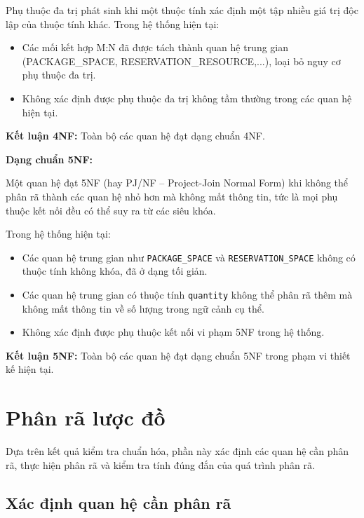 Phụ thuộc đa trị phát sinh khi một thuộc tính xác định một tập nhiều giá trị độc lập của thuộc tính khác. Trong hệ thống hiện tại:

\begin{itemize}
    \item Các mối kết hợp M:N đã được tách thành quan hệ trung gian (PACKAGE\_SPACE, RESERVATION\_RESOURCE,...), loại bỏ nguy cơ phụ thuộc đa trị.
    \item Không xác định được phụ thuộc đa trị không tầm thường trong các quan hệ hiện tại.
\end{itemize}

\textbf{Kết luận 4NF:} Toàn bộ các quan hệ đạt dạng chuẩn 4NF.

\textbf{Dạng chuẩn 5NF:}

Một quan hệ đạt 5NF (hay PJ/NF -- Project-Join Normal Form) khi không thể phân rã thành các quan hệ nhỏ hơn mà không mất thông tin, tức là mọi phụ thuộc kết nối đều có thể suy ra từ các siêu khóa.

Trong hệ thống hiện tại:

\begin{itemize}
    \item Các quan hệ trung gian như \texttt{PACKAGE\_SPACE} và \texttt{RESERVATION\_SPACE} không có thuộc tính không khóa, đã ở dạng tối giản.
    \item Các quan hệ trung gian có thuộc tính \texttt{quantity} không thể phân rã thêm mà không mất thông tin về số lượng trong ngữ cảnh cụ thể.
    \item Không xác định được phụ thuộc kết nối vi phạm 5NF trong hệ thống.
\end{itemize}

\textbf{Kết luận 5NF:} Toàn bộ các quan hệ đạt dạng chuẩn 5NF trong phạm vi thiết kế hiện tại.

\section{Phân rã lược đồ}

Dựa trên kết quả kiểm tra chuẩn hóa, phần này xác định các quan hệ cần phân rã, thực hiện phân rã và kiểm tra tính đúng đắn của quá trình phân rã.

\subsection{Xác định quan hệ cần phân rã}

